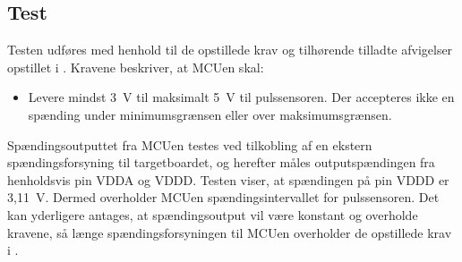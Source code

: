 \subsection{Test}
Testen udføres med henhold til de opstillede krav og tilhørende tilladte afvigelser opstillet i . Kravene beskriver, at MCUen skal:
\begin{itemize}
	\item Levere mindst 3~V til maksimalt 5~V til pulssensoren. Der accepteres ikke en spænding under minimumsgrænsen eller over maksimumsgrænsen.
\end{itemize}

Spændingsoutputtet fra MCUen testes ved tilkobling af en ekstern spændingsforsyning til targetboardet, og herefter måles outputspændingen fra henholdsvis pin VDDA og VDDD.  \newline
Testen viser, at spændingen på pin VDDD er 3,11~V. Dermed overholder MCUen spændingsintervallet for pulssensoren. Det kan yderligere antages, at spændingsoutput vil være konstant og overholde kravene, så længe spændingsforsyningen til MCUen overholder de opstillede krav i .

